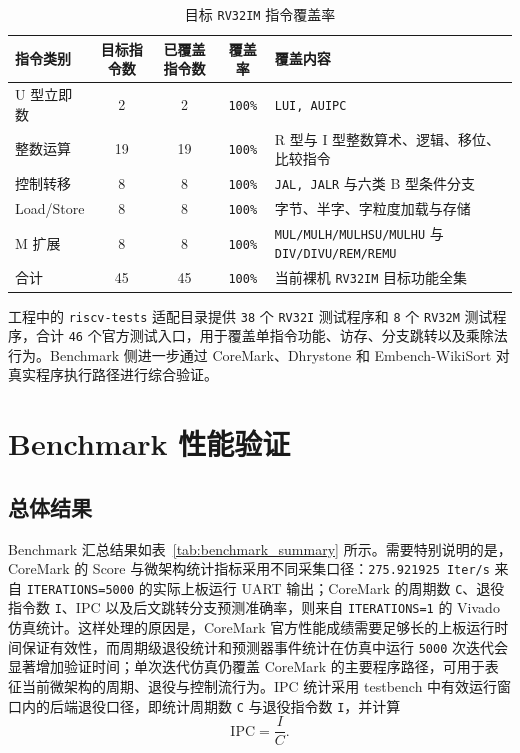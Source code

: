 ﻿\documentclass[UTF8,a4paper,12pt]{ctexart}
\begin{document}
\begin{table}[htbp]
    \centering
    \caption{目标 \texttt{RV32IM} 指令覆盖率}
    \label{tab:isa_coverage}
    \begin{tabularx}{\textwidth}{C{2.4cm}cccY}
        \toprule
        指令类别 & 目标指令数 & 已覆盖指令数 & 覆盖率 & 覆盖内容 \\
        \midrule
        U 型立即数 & 2 & 2 & \texttt{100\%} & \texttt{LUI, AUIPC} \\
        整数运算 & 19 & 19 & \texttt{100\%} & R 型与 I 型整数算术、逻辑、移位、比较指令 \\
        控制转移 & 8 & 8 & \texttt{100\%} & \texttt{JAL, JALR} 与六类 B 型条件分支 \\
        Load/Store & 8 & 8 & \texttt{100\%} & 字节、半字、字粒度加载与存储 \\
        M 扩展 & 8 & 8 & \texttt{100\%} & \texttt{MUL/MULH/MULHSU/MULHU} 与 \texttt{DIV/DIVU/REM/REMU} \\
        \midrule
        合计 & 45 & 45 & \texttt{100\%} & 当前裸机 \texttt{RV32IM} 目标功能全集 \\
        \bottomrule
    \end{tabularx}
\end{table}

工程中的 \texttt{riscv-tests} 适配目录提供 \texttt{38} 个 \texttt{RV32I} 测试程序和 \texttt{8} 个 \texttt{RV32M} 测试程序，合计 \texttt{46} 个官方测试入口，用于覆盖单指令功能、访存、分支跳转以及乘除法行为。Benchmark 侧进一步通过 CoreMark、Dhrystone 和 Embench-WikiSort 对真实程序执行路径进行综合验证。

\section{Benchmark 性能验证}

\subsection{总体结果}

Benchmark 汇总结果如表~\ref{tab:benchmark_summary} 所示。需要特别说明的是，CoreMark 的 Score 与微架构统计指标采用不同采集口径：\texttt{275.921925 Iter/s} 来自 \texttt{ITERATIONS=5000} 的实际上板运行 UART 输出；CoreMark 的周期数 \texttt{C}、退役指令数 \texttt{I}、IPC 以及后文跳转分支预测准确率，则来自 \texttt{ITERATIONS=1} 的 Vivado 仿真统计。这样处理的原因是，CoreMark 官方性能成绩需要足够长的上板运行时间保证有效性，而周期级退役统计和预测器事件统计在仿真中运行 \texttt{5000} 次迭代会显著增加验证时间；单次迭代仿真仍覆盖 CoreMark 的主要程序路径，可用于表征当前微架构的周期、退役与控制流行为。IPC 统计采用 testbench 中有效运行窗口内的后端退役口径，即统计周期数 \texttt{C} 与退役指令数 \texttt{I}，并计算
\[
    \mathrm{IPC}=\frac{I}{C}.
\]
\end{document}
